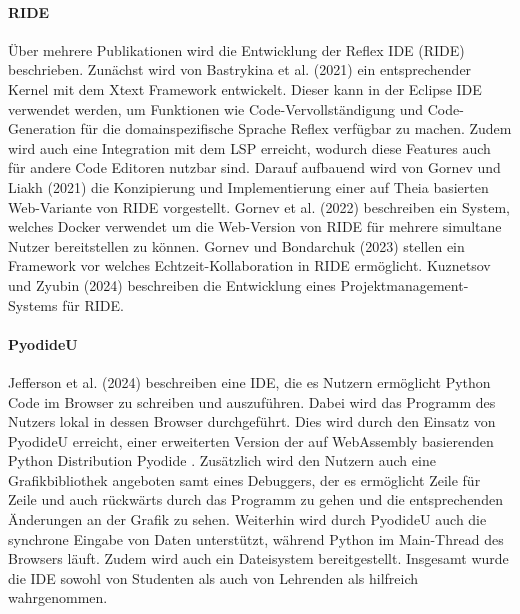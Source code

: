 \paragraph{RIDE}
Über mehrere Publikationen wird die Entwicklung der Reflex IDE (RIDE) beschrieben. Zunächst wird von Bastrykina et al. (2021) \cite{bastrykina_developing_2021} ein entsprechender Kernel mit dem Xtext Framework \cite{noauthor_xtext_nodate} entwickelt. Dieser kann in der Eclipse IDE verwendet werden, um Funktionen wie Code-Vervollständigung und Code-Generation für die domainspezifische Sprache Reflex verfügbar zu machen. Zudem wird auch eine Integration mit dem \ac{LSP} \cite{noauthor_language-server-protocol_nodate} erreicht, wodurch diese Features auch für andere Code Editoren nutzbar sind. Darauf aufbauend wird von Gornev und Liakh (2021) \cite{gornev_ride_2021} die Konzipierung und Implementierung einer auf Theia basierten Web-Variante von RIDE vorgestellt. Gornev et al. (2022) \cite{gornev_towards_2022} beschreiben ein System, welches Docker verwendet um die Web-Version von RIDE für mehrere simultane Nutzer bereitstellen zu können. Gornev und Bondarchuk (2023) \cite{gornev_towards_2023} stellen ein Framework vor welches Echtzeit-Kollaboration in RIDE ermöglicht. Kuznetsov und Zyubin (2024) \cite{kuznetsov_development_2024} beschreiben die Entwicklung eines Projektmanagement-Systems für RIDE.

\paragraph{PyodideU}
Jefferson et al. (2024) \cite{jefferson_pyodideu_2024} beschreiben eine IDE, die es Nutzern ermöglicht Python Code im Browser zu schreiben und auszuführen. Dabei wird das Programm des Nutzers lokal in dessen Browser durchgeführt. Dies wird durch den Einsatz von PyodideU erreicht, einer erweiterten Version der auf WebAssembly basierenden Python Distribution Pyodide \cite{noauthor_pyodide_nodate}. Zusätzlich wird den Nutzern auch eine Grafikbibliothek angeboten samt eines Debuggers, der es ermöglicht Zeile für Zeile und auch rückwärts durch das Programm zu gehen und die entsprechenden Änderungen an der Grafik zu sehen. Weiterhin wird durch PyodideU auch die synchrone Eingabe von Daten unterstützt, während Python im Main-Thread des Browsers läuft. Zudem wird auch ein Dateisystem bereitgestellt. Insgesamt wurde die IDE sowohl von Studenten als auch von Lehrenden als hilfreich wahrgenommen.

